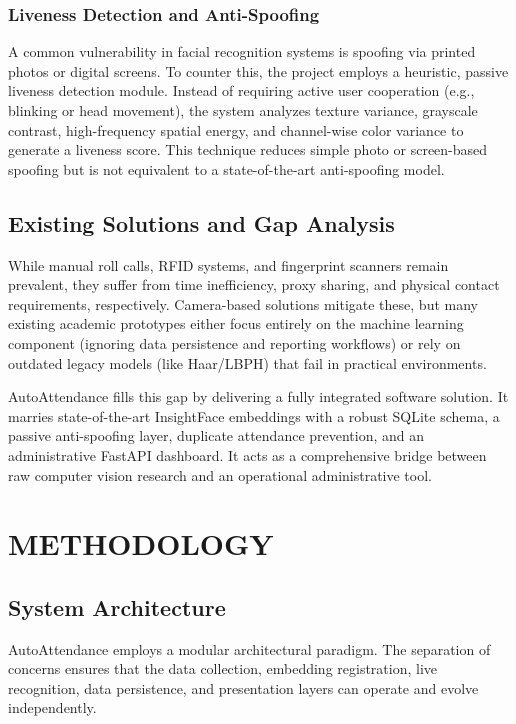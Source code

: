 \documentclass[12pt,a4paper]{report}
\newcommand{\JustifiedNormal}{\fontsize{12}{14}\selectfont\justifying\setlength{\parindent}{0pt}}
\begin{document}
\subsection{Liveness Detection and Anti-Spoofing}
\JustifiedNormal
A common vulnerability in facial recognition systems is spoofing via printed photos or digital screens. To counter this, the project employs a heuristic, passive liveness detection module. Instead of requiring active user cooperation (e.g., blinking or head movement), the system analyzes texture variance, grayscale contrast, high-frequency spatial energy, and channel-wise color variance to generate a liveness score. This technique reduces simple photo or screen-based spoofing but is not equivalent to a state-of-the-art anti-spoofing model.

\section{Existing Solutions and Gap Analysis}
\JustifiedNormal
While manual roll calls, RFID systems, and fingerprint scanners remain prevalent, they suffer from time inefficiency, proxy sharing, and physical contact requirements, respectively. Camera-based solutions mitigate these, but many existing academic prototypes either focus entirely on the machine learning component (ignoring data persistence and reporting workflows) or rely on outdated legacy models (like Haar/LBPH) that fail in practical environments. 

AutoAttendance fills this gap by delivering a fully integrated software solution. It marries state-of-the-art InsightFace embeddings with a robust SQLite schema, a passive anti-spoofing layer, duplicate attendance prevention, and an administrative FastAPI dashboard. It acts as a comprehensive bridge between raw computer vision research and an operational administrative tool.

\chapter{METHODOLOGY}

\section{System Architecture}
\JustifiedNormal
AutoAttendance employs a modular architectural paradigm. The separation of concerns ensures that the data collection, embedding registration, live recognition, data persistence, and presentation layers can operate and evolve independently. 
\end{document}
